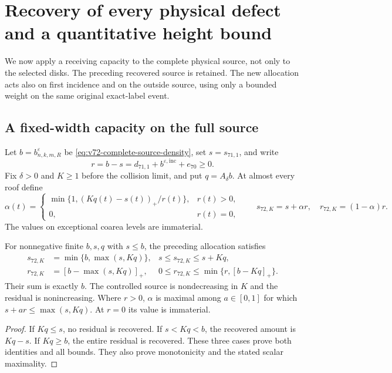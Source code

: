 \section{Recovery of every physical defect and a quantitative height bound}
\label{sec:v72-all-source-recovery}
We now apply a receiving capacity to the complete physical source,
not only to the selected disks. The preceding recovered source is
retained. The new allocation acts also on first incidence and on the
outside source, using only a bounded weight on the same original
exact-label event.

\subsection{A fixed-width capacity on the full source}
Let $b=b^\varepsilon_{n,k,m,R}$ be
\eqref{eq:v72-complete-source-density}, set $s=s_{71,1}$, and write
\begin{equation}\label{eq:v72-original-residual}
 r=b-s=d_{71,1}+b^{\varepsilon,\mathrm{inc}}+e_{70}\ge0.
\end{equation}
Fix $\delta>0$ and $K\ge1$ before the collision limit, and put
$q=A_\delta b$. At almost every roof define
\begin{equation}\label{eq:v72-allocation}
 \alpha(t)=
 \begin{cases}
 \min\{1,(Kq(t)-s(t))_+/r(t)\},&r(t)>0,\\
 0,&r(t)=0,
 \end{cases}
 \qquad s_{72,K}=s+\alpha r,\quad r_{72,K}=(1-\alpha)r.
\end{equation}
The values on exceptional coarea levels are immaterial.

\begin{lemma}
\label{lem:v72-preserved-recovery}
For nonnegative finite $b,s,q$ with $s\le b$, the preceding
allocation satisfies
\begin{align}
 s_{72,K}&=\min\{b,\max(s,Kq)\},
                  &s\le s_{72,K}\le s+Kq,
                                      \label{eq:v72-controlled-algebra}\\
 r_{72,K}&=[b-\max(s,Kq)]_+,
                  &0\le r_{72,K}\le\min\{r,[b-Kq]_+\}.
                                      \label{eq:v72-residual-algebra}
\end{align}
Their sum is exactly $b$. The controlled source is nondecreasing
in $K$ and the residual is nonincreasing. Where $r>0$, $\alpha$
is maximal among $a\in[0,1]$ for which
$s+ar\le\max(s,Kq)$. At $r=0$ its value is immaterial.
\end{lemma}
\begin{proof}
If $Kq\le s$, no residual is recovered. If $s<Kq<b$, the
recovered amount is $Kq-s$. If $Kq\ge b$, the entire residual
is recovered. These three cases prove both identities and all bounds.
They also prove monotonicity and the stated scalar maximality.
\end{proof}

